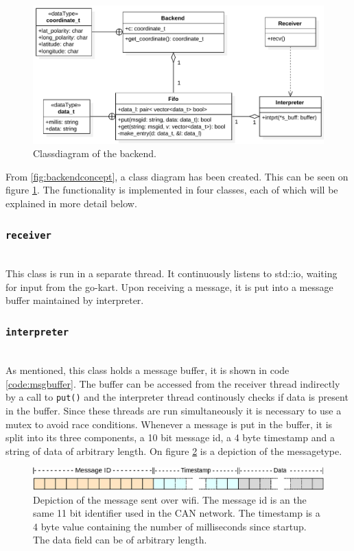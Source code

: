 \begin{figure}[H]
	\includegraphics[width=\linewidth]{graphics/backend_class_diagram}
	\caption[Backend class diagram.]{Classdiagram of the backend.}
	\label{fig:backendclass}
\end{figure}
From \ref{fig:backendconcept}, a class diagram has been created.
This can be seen on figure \ref{fig:backendclass}.
The functionality is implemented in four classes, each of which will be explained in more detail below.

\subsubsection{\texttt{receiver}}~\\
This class is run in a separate thread.
It continuously listens to std::io, waiting for input from the go-kart.
Upon receiving a message, it is put into a message buffer maintained by interpreter.
\subsubsection{\texttt{interpreter}}\label{sub:backend_intepreter}~\\
As mentioned, this class holds a message buffer, it is shown in code \ref{code:msgbuffer}.
The buffer can be accessed from the receiver thread indirectly by a call to \texttt{put()} and the interpreter thread continously checks if data is present in the buffer.
Since these threads are run simultaneously it is necessary to use a mutex to avoid race conditions.
Whenever a message is put in the buffer, it is split into its three components, a 10 bit message id, a 4 byte timestamp and a string of data of arbitrary length.
On figure \ref{fig:backendmsg} is a depiction of the messagetype.
\begin{figure}[H]
	\includegraphics[width=\linewidth]{graphics/backend_message}
	\caption[Front end message.]{Depiction of the message sent over wifi. The message id is an the same 11 bit identifier used in the CAN network.
	The timestamp is a 4 byte value containing the number of milliseconds since startup.
	The data field can be of arbitrary length.}
	\label{fig:backendmsg}
\end{figure}

